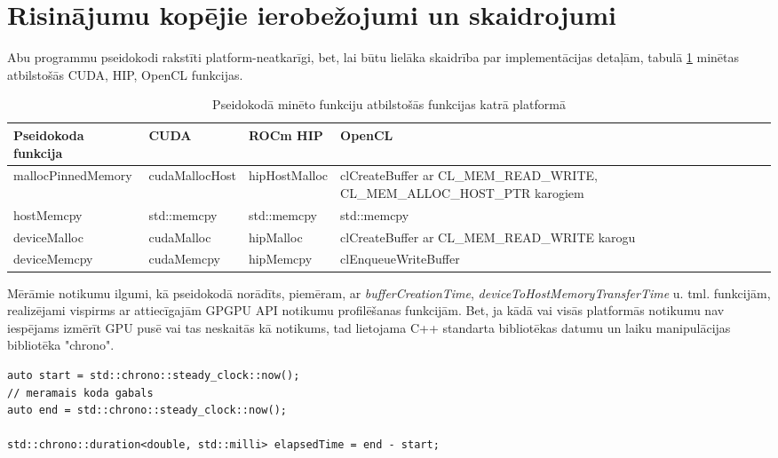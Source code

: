 \section{Risinājumu kopējie ierobežojumi un skaidrojumi}
Abu programmu pseidokodi rakstīti platform-neatkarīgi, bet, lai būtu lielāka
skaidrība par implementācijas detaļām, tabulā
\ref{tab:pseudocode_representations} minētas atbilstošās CUDA, HIP, OpenCL
funkcijas.

\begin{table}[!ht]
\caption{Pseidokodā minēto funkciju atbilstošās funkcijas katrā platformā}
\label{tab:pseudocode_representations} 
\begin{tabularx}{\textwidth}{
  >{\raggedright\arraybackslash}p{}
  >{\raggedright\arraybackslash}p{}
  >{\raggedright\arraybackslash}p{}
  >{\raggedright\arraybackslash}p{}
}
\hline
\textbf{Pseidokoda funkcija} & \textbf{CUDA} & \textbf{ROCm HIP} & \textbf{OpenCL} \\ \hline
mallocPinnedMemory & cudaMallocHost & hipHostMalloc & clCreateBuffer ar CL\_MEM\_READ\_WRITE, CL\_MEM\_ALLOC\_HOST\_PTR karogiem \\ \hline
hostMemcpy & std::memcpy & std::memcpy & std::memcpy \\ \hline
deviceMalloc & cudaMalloc & hipMalloc & clCreateBuffer ar CL\_MEM\_READ\_WRITE karogu \\ \hline
deviceMemcpy & cudaMemcpy & hipMemcpy & clEnqueueWriteBuffer \\
\hline
\end{tabularx}
\end{table}

Mērāmie notikumu ilgumi, kā pseidokodā norādīts, piemēram, ar
\textit{bufferCreationTime}, \textit{deviceToHostMemoryTransferTime} u. tml.
funkcijām, realizējami vispirms ar attiecīgajām GPGPU API notikumu profilēšanas
funkcijām. Bet, ja kādā vai visās platformās notikumu nav iespējams izmērīt GPU
pusē vai tas neskaitās kā notikums, tad lietojama C++ standarta bibliotēkas
datumu un laiku manipulācijas bibliotēka "chrono".\cite{std_chrono}

\begin{lstlisting}[caption={"chrono" laika mērīšanas piemērs},
    captionpos=b,
    label=lst:chrono_example]
auto start = std::chrono::steady_clock::now();
// meramais koda gabals
auto end = std::chrono::steady_clock::now();

std::chrono::duration<double, std::milli> elapsedTime = end - start;
\end{lstlisting}

